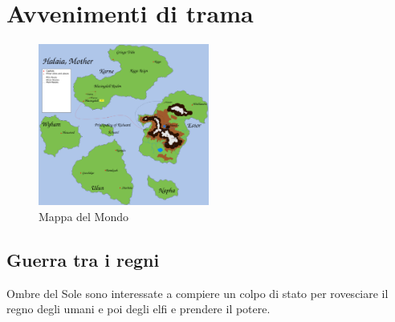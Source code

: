 \section{Avvenimenti di trama}
\begin{figure}[h]
  \centering
  \includegraphics[width=0.5\textwidth]{../../drawings/WorldMap/rect181.png}
  \caption{Mappa del Mondo}
  \label{fig:worldmap}
\end{figure}
\subsection{Guerra tra i regni}
Ombre del Sole sono interessate a compiere un colpo di stato per rovesciare il regno degli umani e
poi degli elfi e prendere il potere.